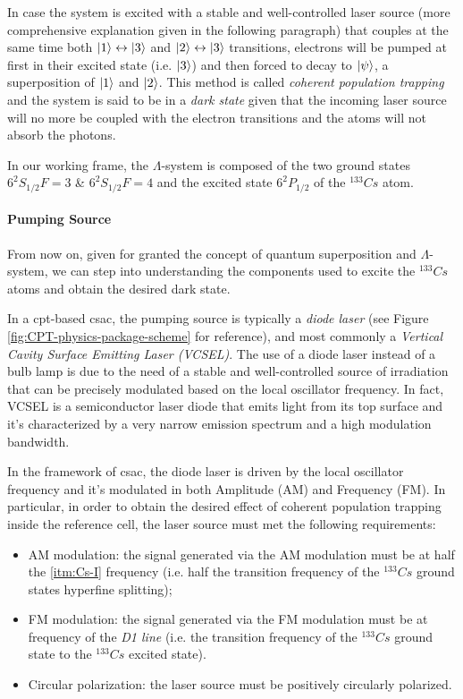 In case the system is excited with a stable and well-controlled laser source (more comprehensive explanation given in the following paragraph) that couples at the same time both $\ket{1} \leftrightarrow \ket{3}$ and $\ket{2} \leftrightarrow \ket{3}$ transitions, electrons will be pumped at first in their excited state (i.e. $\ket{3}$) and then forced to decay to $\ket{\psi}$, a superposition of $\ket{1}$ and $\ket{2}$.
This method is called \textit{coherent population trapping} and the system is said to be in a \textit{dark state} given that the incoming laser source will no more be coupled with the electron transitions and the atoms will not absorb the photons.

In our working frame, the $\Lambda$-system is composed of the two ground states $6^2S_{1/2} F=3$ \& $6^2S_{1/2} F=4$ and the excited state $6^2P_{1/2}$ of the $^{133}Cs$ atom.


\paragraph{Pumping Source}

From now on, given for granted the concept of quantum superposition and $\Lambda$-system, we can step into understanding the components used to excite the $^{133}Cs$ atoms and obtain the desired dark state.

In a \acrshort{cpt}-based \acrshort{csac}, the pumping source is typically a \textit{diode laser} (see Figure \ref{fig:CPT-physics-package-scheme} for reference), and most commonly a \textit{Vertical Cavity Surface Emitting Laser (VCSEL)}.
The use of a diode laser instead of a bulb lamp is due to the need of a stable and well-controlled source of irradiation that can be precisely modulated based on the local oscillator frequency.
In fact, VCSEL is a semiconductor laser diode that emits light from its top surface and it's characterized by a very narrow emission spectrum and a high modulation bandwidth.

In the framework of \acrshort{csac}, the diode laser is driven by the local oscillator frequency and it's modulated in both Amplitude (AM) and Frequency (FM).
In particular, in order to obtain the desired effect of coherent population trapping inside the reference cell, the laser source must met the following requirements:

\begin{itemize}
    \item AM modulation: the signal generated via the AM modulation must be at half the \ref{itm:Cs-I} frequency (i.e. half the transition frequency of the $^{133}Cs$ ground states hyperfine splitting);
    \item FM modulation: the signal generated via the FM modulation must be at frequency of the \textit{D1 line} (i.e. the transition frequency of the $^{133}Cs$ ground state to the $^{133}Cs$ excited state).
    \item Circular polarization: the laser source must be positively circularly polarized.
\end{itemize}

